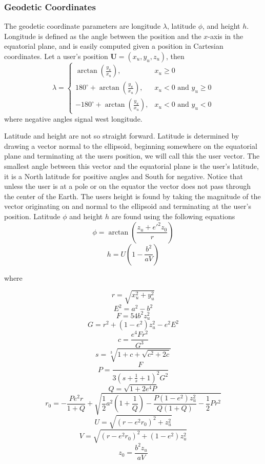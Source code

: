 \subsubsection{Geodetic Coordinates}
The geodetic coordinate parameters are longitude $\lambda$, latitude $\phi$, and height $h$. Longitude is defined as the angle between the position and the $x$-axis in the equatorial plane, and is easily computed given a position in Cartesian coordinates. Let a user's position $\mathbf{U}=(x_{u},y_{u},z_{u})$, then
\[ \lambda = \left \{ \begin{array}{ll}
\arctan \left( \frac{y_{u}}{x_{u}} \right), & \mbox{$x_{u} \geq 0$} \\
180^{\circ} + \arctan \left( \frac{y_{u}}{x_{u}} \right), & \mbox{$x_{u} < 0$ and $y_{u} \geq 0$} \\
-180^{\circ} +\arctan \left( \frac{y_{u}}{x_{u}} \right), & \mbox{$x_{u} < 0$ and $y_{u} < 0$}
\end{array}
\right. \]
where negative angles signal west longitude.

Latitude and height are not so straight forward. Latitude is determined by drawing a vector normal to the ellipsoid, beginning somewhere on the equatorial plane and terminating at the users position, we will call this the user vector. The smallest angle between this vector and the equatorial plane is the user's latitude, it is a North latitude for positive angles and South for negative. Notice that unless the user is at a pole or on the equator the vector does not pass through the center of the Earth. The users height is found by taking the magnitude of the vector originating on and normal to the ellipsoid and terminating at the user's position. Latitude $\phi$ and height $h$ are found using the following equations
\[ \phi = \arctan\left(\frac{z_{u}+e'^{2}z_{0}}{r}\right) \]
\[ h = U \left(1-\frac{b^{2}}{aV}\right) \]

where

\[ r = \sqrt{x_{u}^{2}+y_{u}^{2}} \]
\[ E^{2} = a^{2} - b^{2} \]
\[ F = 54 b^{2} z_{u}^{2} \]
\[ G = r^{2} + (1-e^{2}) z_{u}^{2} - e^{2} E^{2} \]
\[ c = \frac{e^{4} F r^{2}}{G^{3}} \]
\[ s = \sqrt[3]{1+c+\sqrt{c^{2} + 2c}}\]
\[ P = \frac{F}{3 \left( s + \frac{1}{s} + 1  \right)^{2}G^{2} } \]
\[ Q = \sqrt{1+2e^{4}P} \]
\[ r_{0} = -\frac{Pe^{2}r}{1+Q}+\sqrt{\frac{1}{2}a^{2} \left(1+\frac{1}{Q}\right)-\frac{P(1-e^{2})z_{u}^{2}}{Q(1+Q)}-\frac{1}{2}Pr^{2}}\]
\[ U = \sqrt{(r-e^{2}r_{0})^{2}+z_{u}^{2}}\]
\[ V = \sqrt{(r-e^{2}r_{0})^{2}+(1-e^{2})z_{u}^{2}} \]
\[ z_{0} = \frac{b^{2}z_{u}}{aV} \]


